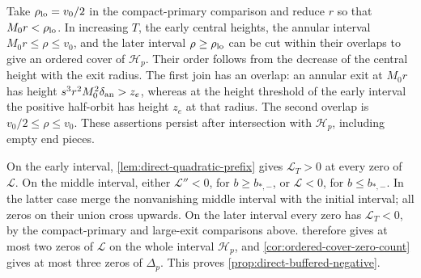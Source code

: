 Take \(\rho_{\rm lo}=v_0/2\) in the compact-primary comparison and reduce \(r\)
so that \(M_0r<\rho_{\rm lo}\). In increasing
\(T\), the early central heights, the annular interval
\(M_0r\le\rho\le v_0\), and the later interval \(\rho\ge\rho_{\rm lo}\)
can be cut within their overlaps to give an ordered cover of
\(\mathcal H_p\). Their order
follows from the decrease of the central height with the exit radius.
The first join has an overlap: an annular exit at \(M_0r\)
has height \(s^3r^2M_0^2\delta_{\rm an}>z_e\), whereas at the height
threshold of the early interval the positive half-orbit has height
\(z_e\) at that radius. The second overlap is
\(v_0/2\le\rho\le v_0\). These assertions persist after
intersection with \(\mathcal H_p\), including empty end pieces.

On the early interval, \cref{lem:direct-quadratic-prefix} gives
\(\mathcal L_T>0\) at every zero of \(\mathcal L\).
On the middle interval, either \(\mathcal L''<0\), for
\(b\ge b_{*,-}\), or \(\mathcal L<0\), for \(b\le b_{*,-}\).
In the latter case merge the nonvanishing middle interval with the
initial interval; all zeros on their union cross upwards.
On the later interval every zero has \(\mathcal L_T<0\), by the
compact-primary and large-exit comparisons above.
 therefore gives at most two
zeros of \(\mathcal L\) on the whole interval \(\mathcal H_p\), and
\cref{cor:ordered-cover-zero-count} gives at most three zeros of
\(\Delta_p\). This proves \cref{prop:direct-buffered-negative}.

